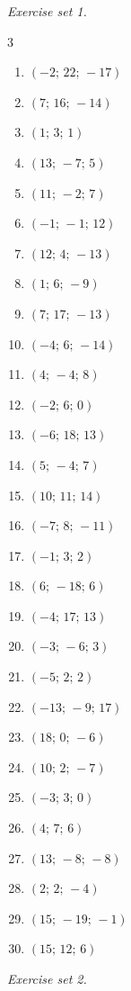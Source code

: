 \par\noindent\emph{Exercise set 1.}\nopagebreak
\begin{multicols}{3}\raggedright
\begin{enumerate}[label=\arabic*., leftmargin=*, itemsep=1pt]
\item $(-2;\,22;\,-17)$
\item $(7;\,16;\,-14)$
\item $(1;\,3;\,1)$
\item $(13;\,-7;\,5)$
\item $(11;\,-2;\,7)$
\item $(-1;\,-1;\,12)$
\item $(12;\,4;\,-13)$
\item $(1;\,6;\,-9)$
\item $(7;\,17;\,-13)$
\item $(-4;\,6;\,-14)$
\item $(4;\,-4;\,8)$
\item $(-2;\,6;\,0)$
\item $(-6;\,18;\,13)$
\item $(5;\,-4;\,7)$
\item $(10;\,11;\,14)$
\item $(-7;\,8;\,-11)$
\item $(-1;\,3;\,2)$
\item $(6;\,-18;\,6)$
\item $(-4;\,17;\,13)$
\item $(-3;\,-6;\,3)$
\item $(-5;\,2;\,2)$
\item $(-13;\,-9;\,17)$
\item $(18;\,0;\,-6)$
\item $(10;\,2;\,-7)$
\item $(-3;\,3;\,0)$
\item $(4;\,7;\,6)$
\item $(13;\,-8;\,-8)$
\item $(2;\,2;\,-4)$
\item $(15;\,-19;\,-1)$
\item $(15;\,12;\,6)$
\end{enumerate}
\end{multicols}
\par\noindent\emph{Exercise set 2.}\nopagebreak
